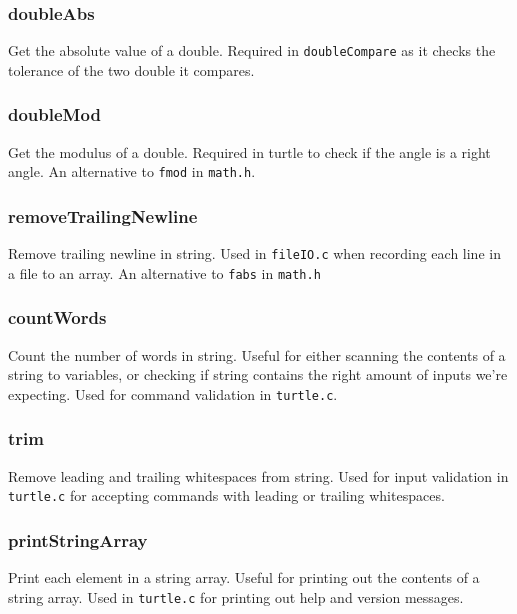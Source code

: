 \documentclass[a4paper, 12pt, titlepage]{article}
\newcommand{\code}[1]{\small\texttt{#1}\normalsize}
\begin{document}
\subsubsection{doubleAbs}

Get the absolute value of a double. Required in \code{doubleCompare} as it 
checks the tolerance of the two double it compares.

\subsubsection{doubleMod}

Get the modulus of a double. Required in turtle to check if the angle is 
a right angle. An alternative to \code{fmod} in \code{math.h}.

\subsubsection{removeTrailingNewline}

Remove trailing newline in string. Used in \code{fileIO.c} when recording 
each line in a file to an array. An alternative to \code{fabs} in 
\code{math.h}

\subsubsection{countWords}

Count the number of words in string. Useful for either scanning the contents 
of a string to variables, or checking if string contains the right amount of 
inputs we're expecting. Used for command validation in \code{turtle.c}.

\subsubsection{trim}

Remove leading and trailing whitespaces from string. Used for input 
validation in \code{turtle.c} for accepting commands with leading or trailing 
whitespaces.

\subsubsection{printStringArray}

Print each element in a string array. Useful for printing out the contents 
of a string array. Used in \code{turtle.c} for printing out help and version 
messages.

\pagebreak
\end{document}
